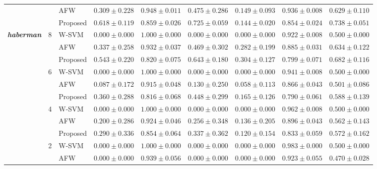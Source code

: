 \documentclass[pdflatex,sn-mathphys-num]{sn-jnl}%
\theoremstyle{thmstyleone}%
\theoremstyle{thmstyletwo}
\theoremstyle{thmstylethree}
\begin{document}
\begin{table}[htbp]
{\begin{tabular}{lllcccccc}
& & AFW     & $0.309 \pm 0.228$ & $0.948 \pm 0.011$ & $0.475 \pm 0.286$ & $\mathbf{0.149 \pm 0.093}$ & $0.936 \pm 0.008$ & $0.629 \pm 0.110$ \\
& & Proposed& $\mathbf{0.618 \pm 0.119}$ & $0.859 \pm 0.026$ & $\mathbf{0.725 \pm 0.059}$ & $0.144 \pm 0.020$ & $0.854 \pm 0.024$ & $\mathbf{0.738 \pm 0.051}$ \\
\midrule
\multirow{12}{*}{\textbf{\textit{haberman}}} 
& \multirow{3}{*}{8}
& W-SVM     & $0.000 \pm 0.000$ & $\mathbf{1.000 \pm 0.000}$ & $0.000 \pm 0.000$ & $0.000 \pm 0.000$ & $\mathbf{0.922 \pm 0.008}$ & $0.500 \pm 0.000$ \\
& & AFW     & $0.337 \pm 0.258$ & $0.932 \pm 0.037$ & $0.469 \pm 0.302$ & $0.282 \pm 0.199$ & $0.885 \pm 0.031$ & $0.634 \pm 0.122$ \\
& & Proposed& $\mathbf{0.543 \pm 0.220}$ & $0.820 \pm 0.075$ & $\mathbf{0.643 \pm 0.180}$ & $\mathbf{0.304 \pm 0.127}$ & $0.799 \pm 0.071$ & $\mathbf{0.682 \pm 0.116}$ \\
\cmidrule{2-9}
& \multirow{3}{*}{6}
& W-SVM     & $0.000 \pm 0.000$ & $\mathbf{1.000 \pm 0.000}$ & $0.000 \pm 0.000$ & $0.000 \pm 0.000$ & $\mathbf{0.941 \pm 0.008}$ & $0.500 \pm 0.000$ \\
& & AFW     & $0.087 \pm 0.172$ & $0.915 \pm 0.048$ & $0.130 \pm 0.250$ & $0.058 \pm 0.113$ & $0.866 \pm 0.043$ & $0.501 \pm 0.086$ \\
& & Proposed& $\mathbf{0.360 \pm 0.288}$ & $0.816 \pm 0.068$ & $\mathbf{0.448 \pm 0.299}$ & $\mathbf{0.165 \pm 0.126}$ & $0.790 \pm 0.061$ & $\mathbf{0.588 \pm 0.139}$ \\
\cmidrule{2-9}
& \multirow{3}{*}{4}
& W-SVM     & $0.000 \pm 0.000$ & $\mathbf{1.000 \pm 0.000}$ & $0.000 \pm 0.000$ & $0.000 \pm 0.000$ & $\mathbf{0.962 \pm 0.008}$ & $0.500 \pm 0.000$ \\
& & AFW     & $0.200 \pm 0.286$ & $0.924 \pm 0.046$ & $0.256 \pm 0.348$ & $\mathbf{0.136 \pm 0.205}$ & $0.896 \pm 0.043$ & $0.562 \pm 0.143$ \\
& & Proposed& $\mathbf{0.290 \pm 0.336}$ & $0.854 \pm 0.064$ & $\mathbf{0.337 \pm 0.362}$ & $0.120 \pm 0.154$ & $0.833 \pm 0.059$ & $\mathbf{0.572 \pm 0.162}$ \\
\cmidrule{2-9}
& \multirow{3}{*}{2}
& W-SVM     & $\mathbf{0.000 \pm 0.000}$ & $\mathbf{1.000 \pm 0.000}$ & $\mathbf{0.000 \pm 0.000}$ & $\mathbf{0.000 \pm 0.000}$ & $\mathbf{0.983 \pm 0.000}$ & $\mathbf{0.500 \pm 0.000}$ \\
& & AFW     & $\mathbf{0.000 \pm 0.000}$ & $0.939 \pm 0.056$ & $\mathbf{0.000 \pm 0.000}$ & $\mathbf{0.000 \pm 0.000}$ & $0.923 \pm 0.055$ & $0.470 \pm 0.028$ \\

\end{tabular}}
\end{table}
\end{document}
